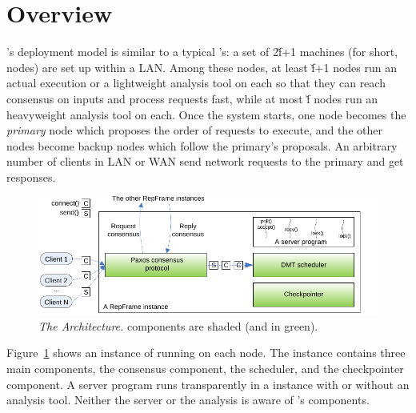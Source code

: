 \section{\xxx Overview} \label{sec:overview}

\xxx's deployment model is similar to a typical \smr's: a set of 2\v{f}+1 
machines (for short, nodes) are set up within a LAN. Among these nodes, at 
least \v{f}+1 nodes run an actual execution or a lightweight analysis tool on 
each so that they can reach consensus on inputs and process requests fast, 
while at most \v{f} nodes run an heavyweight analysis tool on each. Once the 
\xxx system starts, one node becomes the \emph{primary} node which proposes the 
order of requests to execute, and the other nodes become backup nodes which 
follow the primary's proposals. An arbitrary number of clients in LAN or WAN 
send network requests to the primary and get responses.


\begin{figure}[t]
\vspace{.20in}
\centering
\includegraphics[width=.5\textwidth]{figures/arch}
\vspace{-.20in}
\caption{{\em The \xxx Architecture.} \xxx components are shaded (and in
  green).} \label{fig:arch}
\vspace{-.05in}
\end{figure}

Figure~\ref{fig:arch} shows an instance of \xxx running on 
each node. The instance contains three main components, the \paxos consensus 
component, the \dmt scheduler, and the checkpointer component. A server program 
runs transparently in a \xxx instance with or without an analysis tool. Neither 
the server or the analysis is aware of \xxx's components.

